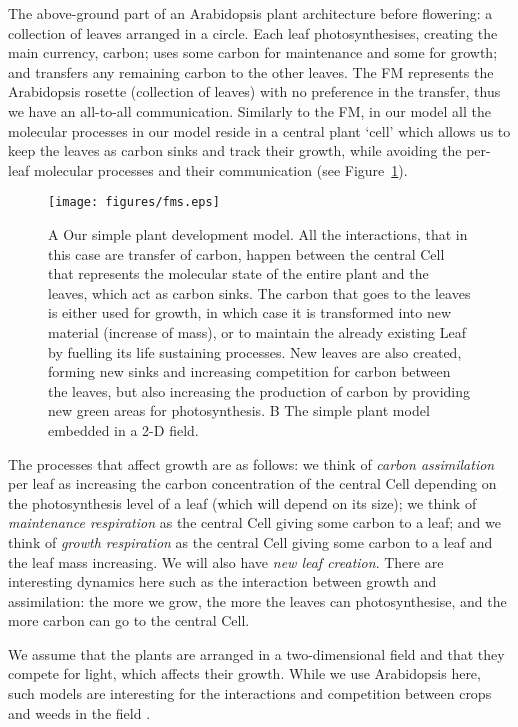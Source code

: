 The above-ground part of an Arabidopsis plant
architecture before flowering: a collection of leaves arranged in a circle. Each
leaf photosynthesises, creating the main currency, carbon; uses some carbon for
maintenance and some for growth; and transfers any remaining carbon to the other
leaves. The FM represents the Arabidopsis rosette (collection of leaves) with no
preference in the transfer, thus we have an all-to-all communication. Similarly
to the FM, in our model all the molecular processes in our model reside in a
central plant `cell' which allows us to keep the leaves as carbon sinks and
track their growth, while avoiding the per-leaf molecular processes and their
communication (see Figure~\ref{fig:fm}).

\begin{figure}
\centering
\texttt{[image: figures/fms.eps]}
\caption{ A Our simple plant development model. All the interactions, that in
  this case are transfer of carbon, happen between the central Cell that
  represents the molecular state of the entire plant and the leaves, which act
  as carbon sinks. The carbon that goes to the leaves is either used for growth,
  in which case it is transformed into new material (increase of mass), or to
  maintain the already existing Leaf by fuelling its life sustaining
  processes. New leaves are also created, forming new sinks and increasing
  competition for carbon between the leaves, but also increasing the production
  of carbon by providing new green areas for photosynthesis. B The simple plant
  model embedded in a 2-D field.}
\label{fig:fm}
\end{figure}

The processes that affect growth are as follows: we think of \textit{carbon
assimilation} per leaf as increasing the carbon concentration of the central
Cell depending on the photosynthesis level of a leaf (which will depend on its
size); we think of \textit{maintenance respiration} as the central Cell giving
some carbon to a leaf; and we think of \textit{growth respiration} as the
central Cell giving some carbon to a leaf and the leaf mass increasing. We will
also have \textit{new leaf creation}. There are interesting dynamics here such
as the interaction between growth and assimilation: the more we grow, the more
the leaves can photosynthesise, and the more carbon can go to the central Cell.

We assume that the plants are arranged in a two-dimensional field and that they
compete for light, which affects their growth. While we use Arabidopsis here,
such models are interesting for the interactions and competition between crops
and weeds in the field \citep{rajcan_understanding_2001}.


